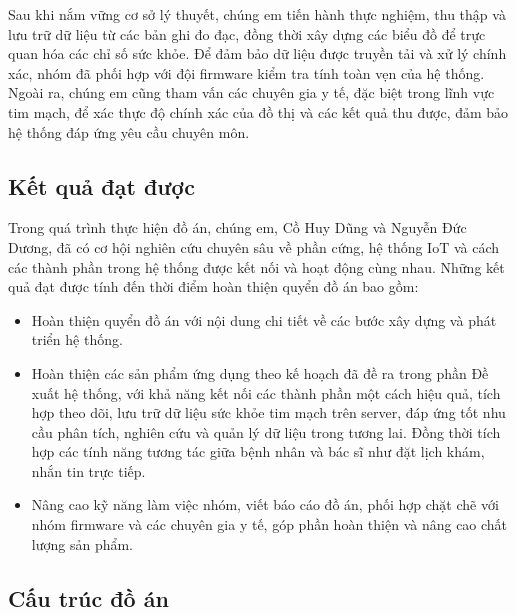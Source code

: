 Sau khi nắm vững cơ sở lý thuyết, chúng em tiến hành thực nghiệm, thu thập và lưu trữ dữ liệu từ các bản ghi đo đạc, đồng thời xây dựng các biểu đồ để trực quan hóa các chỉ số sức khỏe. Để đảm bảo dữ liệu được truyền tải và xử lý chính xác, nhóm đã phối hợp với đội firmware kiểm tra tính toàn vẹn của hệ thống.
Ngoài ra, chúng em cũng tham vấn các chuyên gia y tế, đặc biệt trong lĩnh vực tim mạch, để xác thực độ chính xác của đồ thị và các kết quả thu được, đảm bảo hệ thống đáp ứng yêu cầu chuyên môn.
\subsection*{Kết quả đạt được}

Trong quá trình thực hiện đồ án, chúng em, Cồ Huy Dũng và Nguyễn Đức Dương, đã có cơ hội nghiên cứu chuyên sâu về phần cứng, hệ thống IoT và cách các thành phần trong hệ thống được kết nối và hoạt động cùng nhau.
Những kết quả đạt được tính đến thời điểm hoàn thiện quyển đồ án bao gồm:

\begin{adjustwidth}{1.5em}{}
  \begin{itemize}
      \item Hoàn thiện quyển đồ án với nội dung chi tiết về các bước xây dựng và phát triển hệ thống.
      \item Hoàn thiện các sản phẩm ứng dụng theo kế hoạch đã đề ra trong phần Đề xuất hệ thống, với khả năng kết nối các thành phần một cách hiệu quả, tích hợp theo dõi, lưu trữ dữ liệu sức khỏe tim mạch trên server, đáp ứng tốt nhu cầu phân tích, nghiên cứu và quản lý dữ liệu trong tương lai.
      Đồng thời tích hợp các tính năng tương tác giữa bệnh nhân và bác sĩ như đặt lịch khám, nhắn tin trực tiếp.
      \item Nâng cao kỹ năng làm việc nhóm, viết báo cáo đồ án, phối hợp chặt chẽ với nhóm firmware và các chuyên gia y tế, góp phần hoàn thiện và nâng cao chất lượng sản phẩm.
    \end{itemize}
  \end{adjustwidth}
\subsection*{Cấu trúc đồ án}

